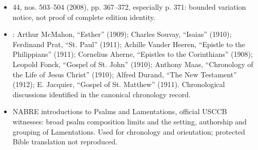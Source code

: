 \begin{itemize}
\item {} 44, nos. 503--504 (2008), pp. 367--372, especially p. 371: bounded variation notice, not proof of complete edition identity.
\item {}: Arthur McMahon, ``Esther'' (1909); Charles Souvay, ``Isaias'' (1910); Ferdinand Prat, ``St. Paul'' (1911); Achille Vander Heeren, ``Epistle to the Philippians'' (1911); Cornelius Aherne, ``Epistles to the Corinthians'' (1908); Leopold Fonck, ``Gospel of St. John'' (1910); Anthony Maas, ``Chronology of the Life of Jesus Christ'' (1910); Alfred Durand, ``The New Testament'' (1912); E. Jacquier, ``Gospel of St. Matthew'' (1911). Chronological discussions identified in the canonical chronology record.
\item NABRE introductions to Psalms and Lamentations, official USCCB witnesses: broad psalm composition limits and the setting, authorship and grouping of Lamentations. Used for chronology and orientation; protected Bible translation not reproduced.
\end{itemize}
